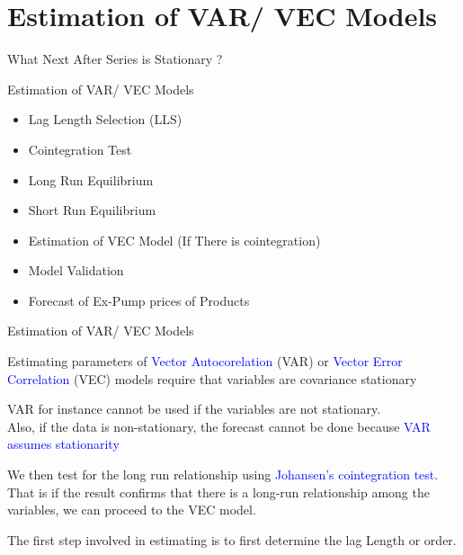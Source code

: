\documentclass{beamer}
\newcommand{\vspaceFive}{\vspace{5pt}}
\newcommand{\colorPrimary}{blue}
\newcommand{\textPrimary}[1]{\textcolor{\colorPrimary}{#1}}
\newcommand{\VARHighlight}{\textPrimary{Vector Autocorelation }}
\newcommand{\VECHighlight}{\textPrimary{Vector Error Correlation }}
\begin{document}
	\section{Estimation of VAR/ VEC Models}
	\begin{frame}{What Next After Series is Stationary ?}
		
		\begin{block}{Estimation of VAR/ VEC Models}
			\vspaceFive
			\begin{itemize}[label=$\diamond$, leftmargin=2em, itemsep=1em]
				\item Lag Length Selection (LLS)
				\item Cointegration Test
				\item Long Run Equilibrium
				\item Short Run Equilibrium
				\item Estimation of VEC Model (If There is cointegration)
				\item Model Validation
				\item Forecast of Ex-Pump prices of Products
			\end{itemize}
			\vspaceFive
		\end{block}
		
	\end{frame}
	
	
	
	\begin{frame}{Estimation of VAR/ VEC Models}
		\begin{block}{}
			Estimating parameters of \VARHighlight (VAR) or \VECHighlight (VEC) models require that variables are 
			covariance stationary \vspaceFive
		\end{block} \vspaceFive
		
		\begin{block}{}
			VAR for instance cannot be used if the variables are not stationary. \\
			Also, if the data is non-stationary, the forecast cannot be done because \textPrimary{VAR assumes stationarity}
		\end{block}
		
		\begin{block}{}
			We then test for the long run relationship using \textPrimary{Johansen’s cointegration test}.  \\
			That is if the result confirms that there is a long-run relationship among the variables, 
			we can proceed to the VEC model. 
		\end{block}
		
		\begin{exampleblock}{}
			The first step involved in estimating is to first determine the lag Length or order. 
		\end{exampleblock}
	\end{frame}
	
\end{document}
